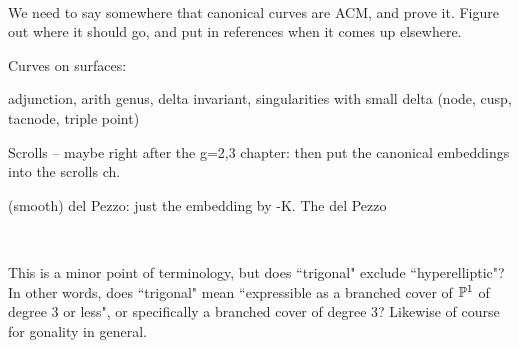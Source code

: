 \documentclass[12pt, leqno]{book}
\begin{document}
\

We need to say somewhere that canonical curves are ACM, and prove it. Figure out where it should go, and put in references when it comes up elsewhere.

Curves on surfaces:

adjunction, arith genus, delta invariant, singularities with small delta (node, cusp, tacnode, triple point)

Scrolls -- maybe right after the g=2,3 chapter:   then put the canonical embeddings into the scrolls ch.

(smooth) del Pezzo: just the embedding by -K. The del Pezzo 

\

This is a minor point of terminology, but does ``trigonal" exclude ``hyperelliptic"? In other words, does ``trigonal" mean ``expressible as a branched cover of $\PP^1$ of degree 3 or less", or specifically a branched cover of degree 3? Likewise of course for gonality in general.
\end{document}

